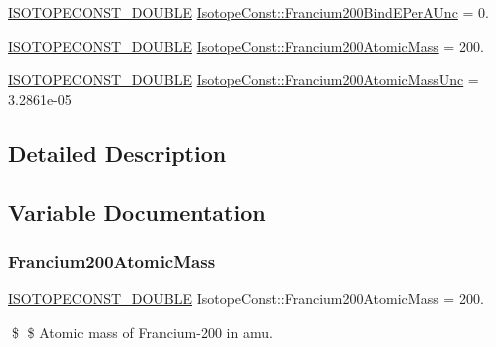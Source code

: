 \begin{DoxyCompactItemize}
\mbox{\hyperlink{group___isotope_const-_macros_ga8f45a7272ce02c0b4c65c44636ed719a}{I\+S\+O\+T\+O\+P\+E\+C\+O\+N\+S\+T\+\_\+\+D\+O\+U\+B\+LE}} \mbox{\hyperlink{group___isotope_const-_francium-_fr200_ga96af6a8d5d9201a63b1821abd2d18c07}{Isotope\+Const\+::\+Francium200\+Bind\+E\+Per\+A\+Unc}} = 0.
\item 
\mbox{\hyperlink{group___isotope_const-_macros_ga8f45a7272ce02c0b4c65c44636ed719a}{I\+S\+O\+T\+O\+P\+E\+C\+O\+N\+S\+T\+\_\+\+D\+O\+U\+B\+LE}} \mbox{\hyperlink{group___isotope_const-_francium-_fr200_ga0d474d60aa8ffa660830cac3ef7fbf79}{Isotope\+Const\+::\+Francium200\+Atomic\+Mass}} = 200.
\item 
\mbox{\hyperlink{group___isotope_const-_macros_ga8f45a7272ce02c0b4c65c44636ed719a}{I\+S\+O\+T\+O\+P\+E\+C\+O\+N\+S\+T\+\_\+\+D\+O\+U\+B\+LE}} \mbox{\hyperlink{group___isotope_const-_francium-_fr200_ga34d36a8c30c7dc0221c9ded0dbe6e4f8}{Isotope\+Const\+::\+Francium200\+Atomic\+Mass\+Unc}} = 3.\+2861e-\/05
\end{DoxyCompactItemize}


\subsection{Detailed Description}


\subsection{Variable Documentation}
\mbox{\label{group___isotope_const-_francium-_fr200_ga0d474d60aa8ffa660830cac3ef7fbf79}} 
\subsubsection{\texorpdfstring{Francium200\+Atomic\+Mass}{Francium200AtomicMass}}
{\footnotesize\ttfamily \mbox{\hyperlink{group___isotope_const-_macros_ga8f45a7272ce02c0b4c65c44636ed719a}{I\+S\+O\+T\+O\+P\+E\+C\+O\+N\+S\+T\+\_\+\+D\+O\+U\+B\+LE}} Isotope\+Const\+::\+Francium200\+Atomic\+Mass = 200.}

\$ \$ Atomic mass of Francium-\/200 in amu. \mbox{\label{group___isotope_const-_francium-_fr200_ga34d36a8c30c7dc0221c9ded0dbe6e4f8}} 
